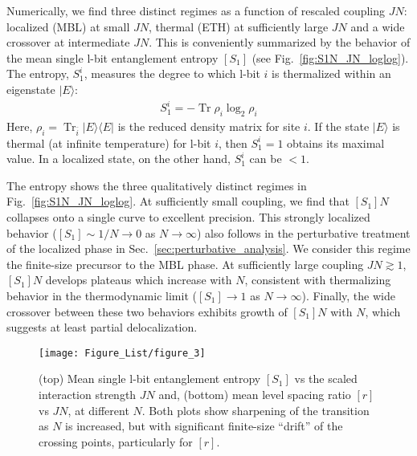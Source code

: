 \documentclass[aps,pra,twocolumn,a4paper,showpacs,superscriptaddress,floatfix,10pt]{revtex4}
\DeclareMathOperator{\Tr}{Tr}
\newcommand{\bra}[1]{\langle#1|}
\newcommand{\ket}[1]{|#1\rangle}
\begin{document}
Numerically, we find three distinct regimes as a function of rescaled coupling $JN$: localized (MBL) at small $JN$, thermal (ETH) at sufficiently large $JN$ and a wide crossover at intermediate $JN$.
This is conveniently summarized by the behavior of the mean single l-bit entanglement entropy $[S_1]$ (see Fig.~\ref{fig:S1N_JN_loglog}).
The entropy, $S_1^i$, measures the degree to which l-bit $i$ is thermalized within an eigenstate $\ket{E}$:
\begin{align}
	S_1^i = - \Tr \rho_i \log_2 \rho_i
\end{align}
Here, $\rho_i = \Tr_{\bar{i}} \ket{E}\bra{E}$ is the reduced density matrix for site $i$.
If the state $\ket{E}$ is thermal (at infinite temperature) for l-bit $i$, then $S_1^i = 1$ obtains its maximal value.
In a localized state, on the other hand, $S_1^i$ can be $< 1$.

The  entropy shows the three qualitatively distinct regimes in Fig.~\ref{fig:S1N_JN_loglog}.
%
At sufficiently small coupling, we find that $[S_1]N$ collapses onto a single curve to excellent precision.
This strongly localized behavior ($[S_1] \sim 1/N \to 0$ as $N \to \infty$) also follows in the perturbative treatment of the localized phase in Sec.~\ref{sec:perturbative_analysis}.
We consider this regime the finite-size precursor to the MBL phase.
%
At sufficiently large coupling $JN \gtrsim 1$, $[S_1]N$ develops plateaus which increase with $N$, consistent with thermalizing behavior in the thermodynamic limit ($[S_1] \to 1$ as $N \to \infty$).
%
Finally, the wide crossover between these two behaviors exhibits growth of $[S_1]N$ with $N$, which suggests at least partial delocalization.

\begin{figure}[tb]
\texttt{[image: Figure\_List/figure\_3]}
\caption{(top) Mean single l-bit entanglement entropy $[S_1]$ vs the scaled interaction strength $JN$ and,
(bottom) mean level spacing ratio $[r]$ vs $JN$, at different $N$.
Both plots show sharpening of the transition as $N$ is increased, but with
significant finite-size ``drift'' of the crossing points, particularly for $[r]$.
}
\label{Fig:S1_R_JN}
\end{figure}
\end{document}

